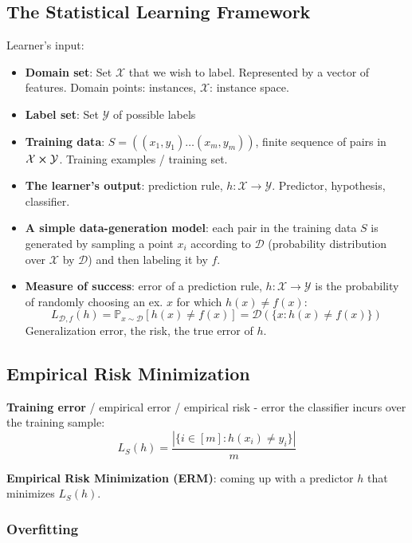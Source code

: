 \subsection{The Statistical Learning Framework}

Learner's input:
\begin{itemize}
    \item \textbf{Domain set}: Set $\mathcal{X}$ that we wish to label. Represented by a vector of features. Domain points: instances, $\mathcal{X}$: instance space.
    \item \textbf{Label set}: Set $\mathcal{Y}$ of possible labels
    \item \textbf{Training data}: $S = ((x_1, y_1) \dots (x_m, y_m))$, finite sequence of pairs in $\mathcal{X} \cross \mathcal{Y}$. Training examples / training set.
    \item \textbf{The learner's output}: prediction rule, $h : \mathcal{X} \rightarrow \mathcal{Y}$. Predictor, hypothesis, classifier.
    \item \textbf{A simple data-generation model}: each pair in the training data $S$ is generated by sampling a point $x_i$ according to $\mathcal{D}$ (probability distribution over $\mathcal{X}$ by $\mathcal{D}$) and then labeling it by $f$.
    \item \textbf{Measure of success}: error of a prediction rule, $h : \mathcal{X} \rightarrow \mathcal{Y}$ is the probability of randomly choosing an ex. $x$ for which $h(x) \neq f(x)$:
    $$L_{\mathcal{D}, f}(h) = \mathbb{P}_{x \sim \mathcal{D}} [h(x) \neq f(x)] = \mathcal{D}(\{x:h(x) \neq f(x)\})$$
    Generalization error, the risk, the true error of $h$.

\end{itemize}

\subsection{Empirical Risk Minimization}

\textbf{Training error} / empirical error / empirical risk - error the classifier incurs over the training sample: $$L_S(h) = \frac{|\{i \in [m] : h(x_i) \neq y_i \}|}{m}$$

\textbf{Empirical Risk Minimization (ERM)}: coming up with a predictor $h$ that minimizes $L_S(h)$.

\subsubsection{Overfitting}

